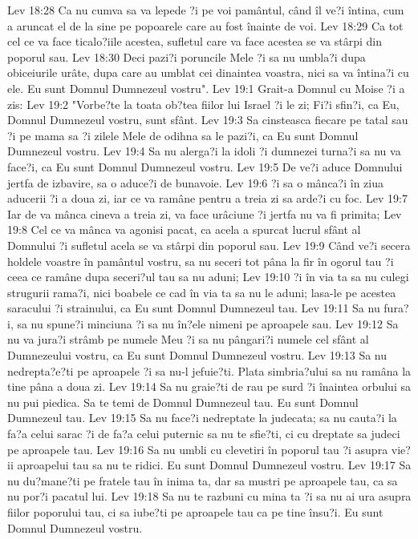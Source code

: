 Lev 18:28  Ca nu cumva sa va lepede ?i pe voi pamântul, când îl ve?i întina, cum a aruncat el de la sine pe popoarele care au fost înainte de voi.
Lev 18:29  Ca tot cel ce va face ticalo?iile acestea, sufletul care va face acestea se va stârpi din poporul sau.
Lev 18:30  Deci pazi?i poruncile Mele ?i sa nu umbla?i dupa obiceiurile urâte, dupa care au umblat cei dinaintea voastra, nici sa va întina?i cu ele. Eu sunt Domnul Dumnezeul vostru".
Lev 19:1  Grait-a Domnul cu Moise ?i a zis:
Lev 19:2  "Vorbe?te la toata ob?tea fiilor lui Israel ?i le zi; Fi?i sfin?i, ca Eu, Domnul Dumnezeul vostru, sunt sfânt.
Lev 19:3  Sa cinsteasca fiecare pe tatal sau ?i pe mama sa ?i zilele Mele de odihna sa le pazi?i, ca Eu sunt Domnul Dumnezeul vostru.
Lev 19:4  Sa nu alerga?i la idoli ?i dumnezei turna?i sa nu va face?i, ca Eu sunt Domnul Dumnezeul vostru.
Lev 19:5  De ve?i aduce Domnului jertfa de izbavire, sa o aduce?i de bunavoie.
Lev 19:6  ?i sa o mânca?i în ziua aducerii ?i a doua zi, iar ce va ramâne pentru a treia zi sa arde?i cu foc.
Lev 19:7  Iar de va mânca cineva a treia zi, va face urâciune ?i jertfa nu va fi primita;
Lev 19:8  Cel ce va mânca va agonisi pacat, ca acela a spurcat lucrul sfânt al Domnului ?i sufletul acela se va stârpi din poporul sau.
Lev 19:9  Când ve?i secera holdele voastre în pamântul vostru, sa nu seceri tot pâna la fir în ogorul tau ?i ceea ce ramâne dupa seceri?ul tau sa nu aduni;
Lev 19:10  ?i în via ta sa nu culegi strugurii rama?i, nici boabele ce cad în via ta sa nu le aduni; lasa-le pe acestea saracului ?i strainului, ca Eu sunt Domnul Dumnezeul tau.
Lev 19:11  Sa nu fura?i, sa nu spune?i minciuna ?i sa nu în?ele nimeni pe aproapele sau.
Lev 19:12  Sa nu va jura?i strâmb pe numele Meu ?i sa nu pângari?i numele cel sfânt al Dumnezeului vostru, ca Eu sunt Domnul Dumnezeul vostru.
Lev 19:13  Sa nu nedrepta?e?ti pe aproapele ?i sa nu-l jefuie?ti. Plata simbria?ului sa nu ramâna la tine pâna a doua zi.
Lev 19:14  Sa nu graie?ti de rau pe surd ?i înaintea orbului sa nu pui piedica. Sa te temi de Domnul Dumnezeul tau. Eu sunt Domnul Dumnezeul tau.
Lev 19:15  Sa nu face?i nedreptate la judecata; sa nu cauta?i la fa?a celui sarac ?i de fa?a celui puternic sa nu te sfie?ti, ci cu dreptate sa judeci pe aproapele tau.
Lev 19:16  Sa nu umbli cu clevetiri în poporul tau ?i asupra vie?ii aproapelui tau sa nu te ridici. Eu sunt Domnul Dumnezeul vostru.
Lev 19:17  Sa nu du?mane?ti pe fratele tau în inima ta, dar sa mustri pe aproapele tau, ca sa nu por?i pacatul lui.
Lev 19:18  Sa nu te razbuni cu mina ta ?i sa nu ai ura asupra fiilor poporului tau, ci sa iube?ti pe aproapele tau ca pe tine însu?i. Eu sunt Domnul Dumnezeul vostru.
